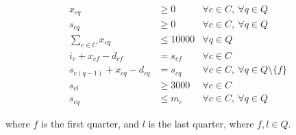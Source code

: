 \documentclass[a4paper]{article}
\begin{document}
\begin{align}
x_{cq} & \geq 0 & \forall c \in C,\  \forall q \in Q \label{C1}\\
s_{cq} & \geq 0 & \forall c \in C,\  \forall q \in Q \label{C2}\\
\sum_{c \in C} x_{cq} & \leq 10000 & \forall q \in Q \label{C3}\\
i_{c} +  x_{cf} - d_{cf} & = s_{cf} & \forall c \in C \label{C4}\\
s_{c(q - 1)} +  x_{cq} - d_{cq} & = s_{cq} & \forall c \in C,\  \forall q \in Q \setminus \{ f \} \label{C5}\\
s_{cl} & \geq 3000 & \forall c \in C \label{C6}\\
s_{cq} & \leq m_c & \forall c \in C,\  \forall q \in Q \label{C7}
\end{align}

where $f$ is the first quarter, and $l$ is the last quarter, where $f, l \in Q$.
\end{document}
